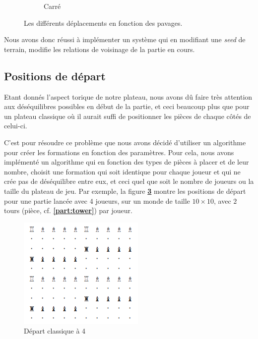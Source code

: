 \begin{figure}[H]
\begin{subfigure}{0.2\textwidth}
                \caption{Carré}
                \label{fig:dep_carre}
            \end{subfigure}
            \caption{Les différents déplacements en fonction des pavages.}
        \end{figure}
        
        Nous avons donc réussi à implémenter un système qui en modifiant une \textit{seed} de terrain, modifie les relations de voisinage de la partie en cours.
    \subsection{Positions de départ}
        Etant donnés l'aspect torique de notre plateau, nous avons dû faire très attention aux déséquilibres possibles en début de la partie, et ceci beaucoup plus que pour un plateau classique où il aurait suffi de positionner les pièces de chaque côtés de celui-ci.

        C'est pour résoudre ce problème que nous avons décidé d'utiliser un algorithme pour créer les formations en fonction des paramètres. Pour cela, nous avons implémenté un algorithme qui en fonction des types de pièces à placer et de leur nombre, choisit une formation qui soit identique pour chaque joueur et qui ne crée pas de déséquilibre entre eux, et ceci quel que soit le nombre de joueurs ou la taille du plateau de jeu. Par exemple, la figure \textbf{\ref{fig:depart_classique_a_4}} montre les positions de départ pour une partie lancée avec 4 joueurs, sur un monde de taille $10\times10$, avec  $2$ tours (pièce, cf. \textbf{\ref{part:tower}}) par joueur.
            
        \begin{figure}[H]
            \centering
            \includegraphics[scale=0.6]{img/depart_classique_a_4.png}
            \caption{Départ classique à 4}
            \label{fig:depart_classique_a_4}
        \end{figure}

